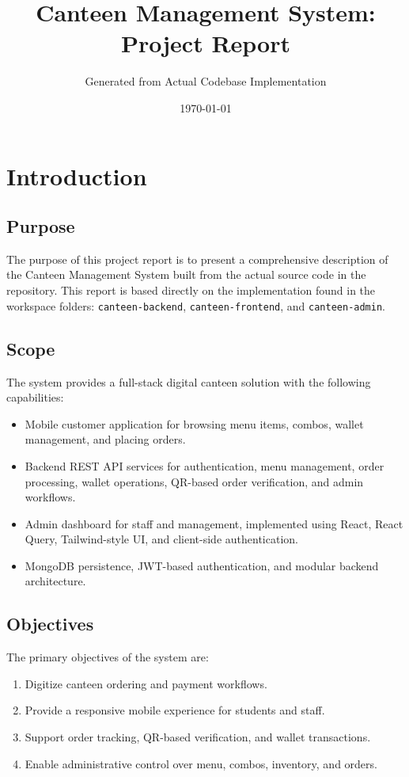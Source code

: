 \documentclass[12pt,a4paper]{report}
\title{Canteen Management System: Project Report}
\author{Generated from Actual Codebase Implementation}
\date{\today}
\begin{document}
\maketitle
\tableofcontents
\clearpage

\chapter{Introduction}
\section{Purpose}
The purpose of this project report is to present a comprehensive description of the Canteen Management System built from the actual source code in the repository. This report is based directly on the implementation found in the workspace folders: \texttt{canteen-backend}, \texttt{canteen-frontend}, and \texttt{canteen-admin}.

\section{Scope}
The system provides a full-stack digital canteen solution with the following capabilities:
\begin{itemize}
  \item Mobile customer application for browsing menu items, combos, wallet management, and placing orders.
  \item Backend REST API services for authentication, menu management, order processing, wallet operations, QR-based order verification, and admin workflows.
  \item Admin dashboard for staff and management, implemented using React, React Query, Tailwind-style UI, and client-side authentication.
  \item MongoDB persistence, JWT-based authentication, and modular backend architecture.
\end{itemize}

\section{Objectives}
The primary objectives of the system are:
\begin{enumerate}
  \item Digitize canteen ordering and payment workflows.
  \item Provide a responsive mobile experience for students and staff.
  \item Support order tracking, QR-based verification, and wallet transactions.
  \item Enable administrative control over menu, combos, inventory, and orders.
\end{enumerate}
\end{document}
